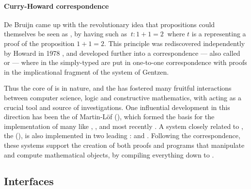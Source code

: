 \paragraph{Curry-Howard correspondence}

\AP
De Bruijn came up with the revolutionary idea that propositions could themselves
be seen as , by having  such as $~t : 1 + 1 = 2~$ where $t$
is a  representing a proof of the proposition $1 + 1 = 2$.
This  principle was rediscovered independently by
Howard in 1978 , and developed further into a
 correspondence --- also called  or  --- where  in the simply-typed
 are put in one-to-one correspondence with proofs in the
implicational fragment of the  system  of Gentzen.

\AP Thus the core of  is \emph{} in nature,
and the  has fostered many fruitful interactions
between computer science, logic and constructive mathematics, with  acting as a crucial tool and source of investigations. One
influential development in this direction has been the  of Martin-Löf (), which formed the basis for the
implementation of many  like , ,
and most recently  \cite{geuvers_proof_2009}. A system closely
related to , the 
(), is also implemented in two leading :
  and 
. Following the 
correspondence, these systems support the creation of both proofs and programs
that manipulate and compute mathematical objects, by compiling everything down
to  .

\subsection{Interfaces}

